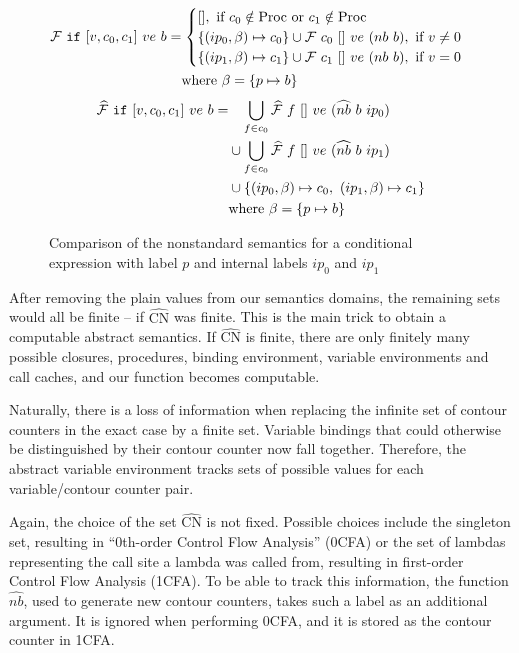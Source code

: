 \documentclass[a4paper,parskip=half,BCOR=8mm,DIV=calc,12pt]{scrbook}
\newcommand{\F}{\mathcal F}
\newcommand{\aF}{\widehat{\mathcal F}}
\begin{document}
\begin{figure}
\begin{framed}
\begin{align*}
\F\ \text{\texttt{if}}\ [v,c_0, c_1]\  ve\ b &=
\begin{cases}
[], \text{ if } c_0 \notin \text{Proc} \text{ or } c_1 \notin \text{Proc} \\
\{ (ip_0,\beta) \mapsto c_0 \} \cup \F\ c_0\ []\ ve\ (nb\ b),\text{ if } v \ne 0 \\
\{ (ip_1,\beta) \mapsto c_1 \} \cup \F\ c_1\ []\ ve\ (nb\ b),\text{ if } v = 0 
\end{cases}\\
&\phantom{\strut=}\text{where } \beta = \{ p \mapsto b \}
\end{align*}
\begin{align*}
\aF\ \text{\texttt{if}}\ [v,c_0, c_1]\  ve\ b &=
\phantom{\cup}\bigcup_{f\in c_0} \aF\ f\ []\ ve\ (\widehat{nb}\ b\ ip_0)\\
&\phantom{\strut=} \cup \bigcup_{f\in c_0} \aF\ f\ []\ ve\ (\widehat{nb}\ b\ ip_1)\\
&\phantom{\strut=} \cup \{ (ip_0, \beta) \mapsto c_0,\ (ip_1, \beta) \mapsto c_1\} \\
&\phantom{\strut=}\text{where } \beta = \{ p \mapsto b \}
\end{align*}
\vspace{-1em}
\end{framed}
\caption{Comparison of the nonstandard semantics for a conditional expression with label $p$ and internal labels $ip_0$ and $ip_1$ }
\label{fig:ifsem}
\end{figure}


After removing the plain values from our semantics domains, the remaining sets would all be finite – if $\widehat{\text{CN}}$ was finite. This is the main trick to obtain a computable abstract semantics. If $\widehat{\text{CN}}$ is finite, there are only finitely many possible closures, procedures, binding environment, variable environments and call caches, and our function becomes computable.

Naturally, there is a loss of information when replacing the infinite set of contour counters in the exact case by a finite set. Variable bindings that could otherwise be distinguished by their contour counter now fall together. Therefore, the abstract variable environment tracks sets of possible values for each variable/contour counter pair.

Again, the choice of the set $\widehat{\text{CN}}$ is not fixed. Possible choices include the singleton set, resulting in “0th-order Control Flow Analysis” (0CFA) or the set of lambdas representing the call site a lambda was called from, resulting in first-order Control Flow Analysis (1CFA). To be able to track this information, the function $\widehat{nb}$, used to generate new contour counters, takes such a label as an additional argument. It is ignored when performing 0CFA, and it is stored as the contour counter in 1CFA.
\end{document}
